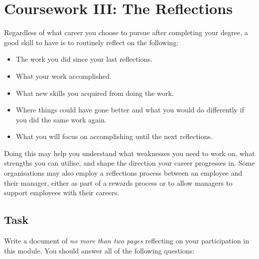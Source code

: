 
\clearpage
\section{Coursework III: The Reflections}

Regardless of what career you choose to pursue after completing your degree, a good skill to have is to routinely reflect on the following:

\begin{itemize}
    \item The work you did since your last reflections.
    \item What your work accomplished.
    \item What new skills you acquired from doing the work.
    \item Where things could have gone better and what you would do differently if you did the same work again.
    \item What you will focus on accomplishing until the next reflections.
\end{itemize}

Doing this may help you understand what weaknesses you need to work on, what strengths you can utilise, and shape the direction your career progresses in. Some organisations may also employ a reflections process between an employee and their manager, either as part of a rewards process or to allow managers to support employees with their careers.

\subsection{Task}

Write a document of \emph{no more than two pages} reflecting on your participation in this module. You should answer all of the following questions:

